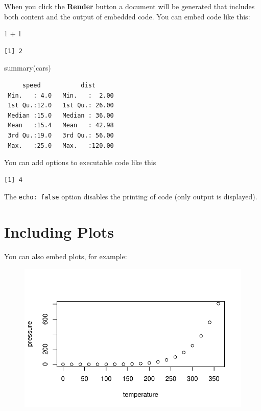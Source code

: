 \documentclass[
  letterpaper,
]{report}
\newenvironment{Shaded}{\begin{snugshade}}{\end{snugshade}}
\newcommand{\DecValTok}[1]{\textcolor[rgb]{0.68,0.00,0.00}{#1}}
\newcommand{\FunctionTok}[1]{\textcolor[rgb]{0.28,0.35,0.67}{#1}}
\newcommand{\NormalTok}[1]{\textcolor[rgb]{0.00,0.23,0.31}{#1}}
\newcommand{\SpecialCharTok}[1]{\textcolor[rgb]{0.37,0.37,0.37}{#1}}
\begin{document}
When you click the \textbf{Render} button a document will be generated
that includes both content and the output of embedded code. You can
embed code like this:

\begin{Shaded}
\begin{Highlighting}[]
\DecValTok{1} \SpecialCharTok{+} \DecValTok{1}
\end{Highlighting}
\end{Shaded}

\begin{verbatim}
[1] 2
\end{verbatim}

\begin{Shaded}
\begin{Highlighting}[]
\FunctionTok{summary}\NormalTok{(cars)}
\end{Highlighting}
\end{Shaded}

\begin{verbatim}
     speed           dist       
 Min.   : 4.0   Min.   :  2.00  
 1st Qu.:12.0   1st Qu.: 26.00  
 Median :15.0   Median : 36.00  
 Mean   :15.4   Mean   : 42.98  
 3rd Qu.:19.0   3rd Qu.: 56.00  
 Max.   :25.0   Max.   :120.00  
\end{verbatim}

You can add options to executable code like this

\begin{verbatim}
[1] 4
\end{verbatim}

The \texttt{echo:\ false} option disables the printing of code (only
output is displayed).

\hypertarget{including-plots}{%
\section{Including Plots}\label{including-plots}}

You can also embed plots, for example:

\begin{figure}

{\centering \includegraphics{ReportTemplate_files/figure-pdf/pressure-1.pdf}

}

\end{figure}
\end{document}
